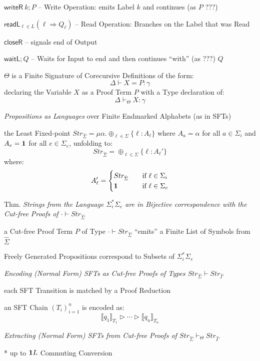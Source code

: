 $\mathsf{writeR}\ k;P$ -- Write Operation: emits Label $k$ and
continues (as $P$ ???) %

$\mathsf{readL}_{\ell\in{L}}(\ell \Rightarrow Q_\ell)$ -- Read
Operation: Branches on the Label that was Read

$\mathsf{closeR}$ -- signals end of Output

$\mathsf{waitL};Q$ -- Waits for Input to end and then continues
``with'' (as ???) $Q$ %

$\Theta$ is a Finite Signature of Corecursive Definitions of the form:
\[
  \Delta \vdash X = P : \gamma
\]
declaring the Variable $X$ as a Proof Term $P$ with a Type declaration
of:
\[
  \Delta \vdash_\Theta X : \gamma
\]

\emph{Propositions as Languages} over Finite Endmarked Alphabets (as
in SFTs)

the Least Fixed-point $Str_{\hat{\Sigma}} =
\mu\alpha.\oplus_{\ell\in\Sigma}\{\ell:A_\ell\}$ where $A_a = \alpha$
for all $a\in\Sigma_i$ and $A_e = \mathbf{1}$ for all $e \in \Sigma_e$,
unfolding to:
\[
  Str_{\hat{\Sigma}} = \oplus_{\ell\in\Sigma}\{\ell:A_\ell'\}
\]
where:
\[
  A_\ell' =
  \begin{cases}
    Str_{\hat{\Sigma}}
      & \quad \text{if $\ell\in\Sigma_i$} \\
    \mathbf{1} & \quad \text{if $\ell\in\Sigma_e$} \\
  \end{cases}
\]

Thm. \emph{Strings from the Language $\Sigma_i^*\Sigma_e$ are in
  Bijective correspondence with the Cut-free Proofs of $\cdot\vdash
  Str_{\hat{\Sigma}}$}

a Cut-free Proof Term $P$ of Type $\cdot\vdash Str_{\hat{\Sigma}}$
``emits'' a Finite List of Symbols from $\hat{\Sigma}$

Freely Generated Propositions correspond to Subsets of
$\Sigma_i^*\Sigma_e$


\emph{Encoding (Normal Form) SFTs as Cut-free Proofs of Types
  $Str_{\hat{\Sigma}} \vdash Str_{\hat{\Gamma}}$} %

each SFT Transition is matched by a Proof Reduction

an SFT Chain $(T_i)^n_{i=1}$ is encoded as:
\[
  \llbracket{q_1}\rrbracket_{T_1} \rhd \cdots \rhd
  \llbracket{q_n}\rrbracket_{T_n}
\]


\emph{Extracting (Normal Form) SFTs from Cut-free Proofs of
  $Str_{\hat{\Sigma}} \vdash_\Theta Str_{\hat{\Gamma}}$}

* up to $\mathbf{1}{L}$ Commuting Conversion

